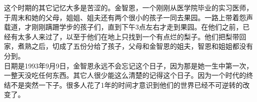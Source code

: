 这个时期的其它记忆大多是苦涩的。金智恩，一个刚刚从医学院毕业的实习医师，于周末和她的父母，姐姐、姐夫还有两个很小的孩子一同去果园。一路上带着怨声载道，才刚刚蹒跚学步的孩子们，直到下午3点左右才走到果园。在他们之前，已经有太多人来过了，以至于他们在地上只找到一个有点烂的梨子。他们把梨带回家，煮熟之后，切成了五份分给了孩子，父母和金智恩的姐夫，智恩和姐姐都没有分到。\\

日期是1993年9月9日，金智恩永远不会忘记这个日子，因为那是她一生中第一次，一整天没吃任何东西。其它人很少能这么清楚的记得这个日子。因为一个时代的终结不是突然一下子。很多人花了1年的时间才意识到他们的世界已经不可逆转的改变了。\\